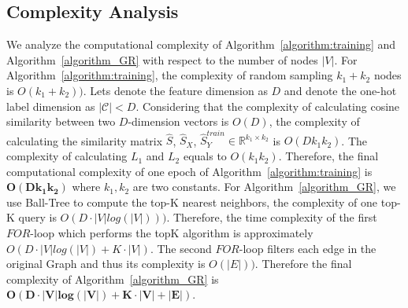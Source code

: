 \documentclass[sigconf]{acmart}
\begin{document}
	\subsection{Complexity Analysis}
	We analyze the computational complexity of Algorithm~\ref{algorithm:training} and Algorithm~\ref{algorithm_GR}  with respect to the number of nodes $|V|$. For Algorithm~\ref{algorithm:training}, the complexity of random sampling $k_1+k_2$ nodes is $O(k_1+k_2))$. Lets denote the feature dimension as $D$  and denote the one-hot label dimension as $|\mathcal{C}|< D$. Considering that the complexity of calculating cosine similarity between two $D$-dimension vectors is $O(D)$, the complexity of calculating the similarity matrix $\widehat{S}$, $\widehat{S}_X$, $\widehat{S}_Y^{train}\in\mathbb{R}^{k_1\times k_2}$  is $O(D k_1 k_2)$. 
	The complexity of calculating $L_1$ and $L_2$ equals to $O(k_1 k_2)$.  Therefore, the final computational complexity of one epoch of Algorithm~\ref{algorithm:training} is $\bm{O(D k_1 k_2)}$ where $k_1,k_2$ are two constants.
	For Algorithm~\ref{algorithm_GR}, we use Ball-Tree to compute the top-K nearest neighbors, the complexity of one top-K query is  $O(D\cdot|V| log(|V|)))$. Therefore, the time complexity of the first $FOR$-loop which performs the topK algorithm is approximately $O(D\cdot|V|log(|V|) + K\cdot|V|)$. The second $FOR$-loop filters each edge in the original Graph and thus its complexity is $O(|E|))$. Therefore the final complexity of Algorithm~\ref{algorithm_GR} is $\bm{O(D\cdot|V|log(|V|) + K\cdot|V| + |E|)}$.
	 	
\end{document}
